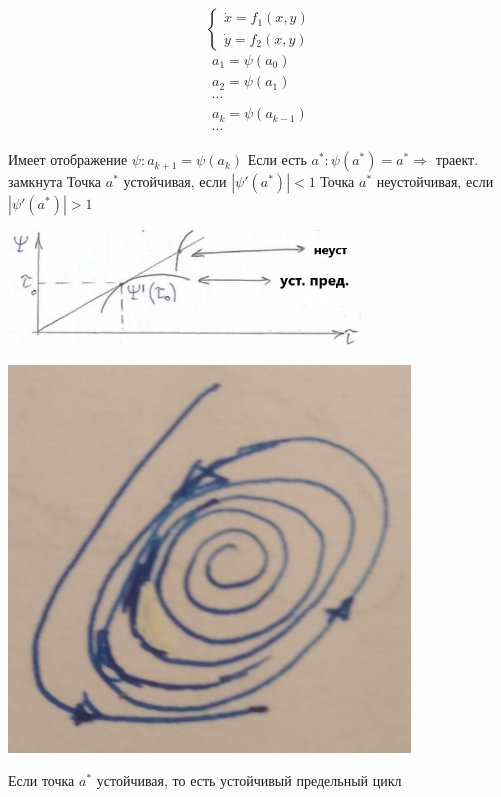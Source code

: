 \documentclass[oneside, final, 12pt]{article}
\theoremstyle{def}
\theoremstyle{th}
\theoremstyle{rem}
\numberwithin{figure}{section}
\numberwithin{equation}{section}
\def\cntrKul{\hspace*{\fill}}
\begin{document}
 	\newpage
	\begin{minipage}{0.1\textwidth} 
		$$
			\begin{cases}
	 			\dot{x} = f_1(x,y) \\
	 			\dot{y} = f_2(x,y)
			\end{cases} 
		$$
		$$
			\begin{gathered}
				a_1 = \psi(a_0) \\
				a_2 = \psi(a_1)  \\ \cdots \\
				a_k =\psi(a_{k-1}) 	\\ \cdots		
			\end{gathered}
		$$
	\end{minipage}
		\hfill
	\begin{minipage}{0.5\textwidth}
		\cntrKul Имеет отображение $\psi: a_{k+1} = \psi(a_k)$ \cntrKul \newline
		\cntrKul Если есть $a^*: \psi(a^*)=a^* \Rightarrow$ траект. замкнута \cntrKul \newline 
		\cntrKul Точка $a^*$ устойчивая, если $|\psi'(a^*)|<1$	\cntrKul \newline 
		\cntrKul Точка $a^*$ неустойчивая, если $|\psi'(a^*)|> 1$ \cntrKul
		\begin{center} \includegraphics[width=0.7\textwidth]{pict/pict_3_2.png} \end{center} 
	\end{minipage}
	\begin{minipage}{0.31\textwidth}
		\begin{center} \includegraphics[width=0.8\textwidth]{pict/pict_3_1.png} \end{center} 
		\cntrKul Если точка $a^*$ устойчивая, \cntrKul \newline
		\cntrKul то есть устойчивый  \cntrKul \newline
		 \cntrKul предельный цикл  \cntrKul
	\end{minipage}		
	
\end{document}
